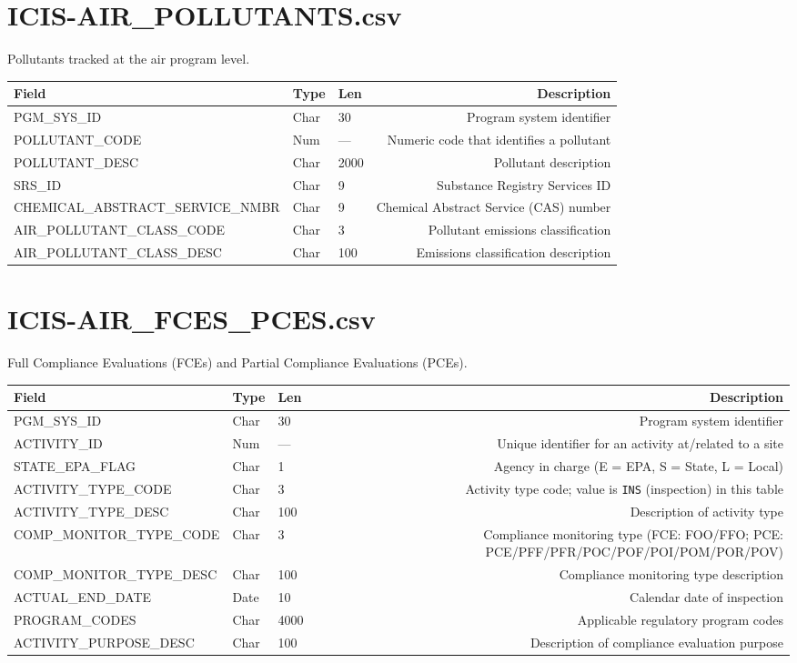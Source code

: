 \documentclass[11pt]{article}
\begin{document}
\section*{ICIS-AIR\_POLLUTANTS.csv}
Pollutants tracked at the air program level.
\begin{longtable}{F T L D}
\toprule
Field & Type & Len & Description \\ \midrule \endhead
PGM\_SYS\_ID & Char & 30 & Program system identifier \\
POLLUTANT\_CODE & Num & --- & Numeric code that identifies a pollutant \\
POLLUTANT\_DESC & Char & 2000 & Pollutant description \\
SRS\_ID & Char & 9 & Substance Registry Services ID \\
CHEMICAL\_ABSTRACT\_SERVICE\_NMBR & Char & 9 & Chemical Abstract Service (CAS) number \\
AIR\_POLLUTANT\_CLASS\_CODE & Char & 3 & Pollutant emissions classification \\
AIR\_POLLUTANT\_CLASS\_DESC & Char & 100 & Emissions classification description \\
\bottomrule
\end{longtable}

\section*{ICIS-AIR\_FCES\_PCES.csv}
Full Compliance Evaluations (FCEs) and Partial Compliance Evaluations (PCEs).
\begin{longtable}{F T L D}
\toprule
Field & Type & Len & Description \\ \midrule \endhead
PGM\_SYS\_ID & Char & 30 & Program system identifier \\
ACTIVITY\_ID & Num & --- & Unique identifier for an activity at/related to a site \\
STATE\_EPA\_FLAG & Char & 1 & Agency in charge (E = EPA, S = State, L = Local) \\
ACTIVITY\_TYPE\_CODE & Char & 3 & Activity type code; value is \texttt{INS} (inspection) in this table \\
ACTIVITY\_TYPE\_DESC & Char & 100 & Description of activity type \\
COMP\_MONITOR\_TYPE\_CODE & Char & 3 & Compliance monitoring type (FCE: FOO/FFO; PCE: PCE/PFF/PFR/POC/POF/POI/POM/POR/POV) \\
COMP\_MONITOR\_TYPE\_DESC & Char & 100 & Compliance monitoring type description \\
ACTUAL\_END\_DATE & Date & 10 & Calendar date of inspection \\
PROGRAM\_CODES & Char & 4000 & Applicable regulatory program codes \\
ACTIVITY\_PURPOSE\_DESC & Char & 100 & Description of compliance evaluation purpose \\
\bottomrule
\end{longtable}
\end{document}
